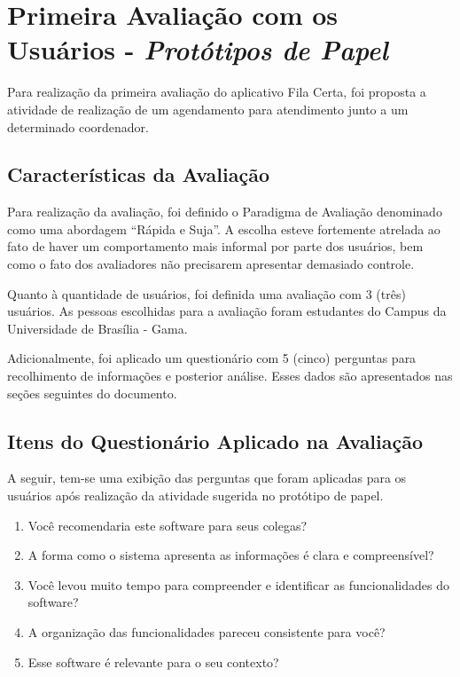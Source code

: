 	\section[Primeira Avaliação com os Usuários - Protótipos de Papel]{Primeira Avaliação com os Usuários - \emph{Protótipos de Papel}}
	\label{sec:avaliacaoPrototipos_Primeira}

		Para realização da primeira avaliação do aplicativo Fila Certa, foi proposta a atividade de realização de um agendamento para atendimento junto a um determinado coordenador.

		\subsection[Características da Avaliação]{Características da Avaliação}
		\label{sec:primeiraAvaliacao_Caracteristicas}

			Para realização da avaliação, foi definido o Paradigma de Avaliação denominado como uma abordagem “Rápida e Suja”. A escolha esteve fortemente atrelada ao fato de haver um comportamento mais informal por parte dos usuários, bem como o fato dos avaliadores não precisarem apresentar demasiado controle.

			Quanto à quantidade de usuários, foi definida uma avaliação com 3 (três) usuários. As pessoas escolhidas para a avaliação foram estudantes do Campus da Universidade de Brasília - Gama.

			Adicionalmente, foi aplicado um questionário com 5 (cinco) perguntas para recolhimento de informações e posterior análise. Esses dados são apresentados nas seções seguintes do documento.

		\subsection[Itens do Questionário Aplicados na Avaliação]{Itens do Questionário Aplicado na Avaliação}
		\label{sec:primeiraAvaliacao_Questionario}

			A seguir, tem-se uma exibição das perguntas que foram aplicadas para os usuários após realização da atividade sugerida no protótipo de papel.

			\begin{enumerate}
				\item{Você recomendaria este software para seus colegas?}
				\item{A forma como o sistema apresenta as informações é clara e compreensível?}
				\item{Você levou muito tempo para compreender e identificar as funcionalidades do software?}
				\item{A organização das funcionalidades pareceu consistente para você?}
				\item{Esse software é relevante para o seu contexto?}
			\end{enumerate}

